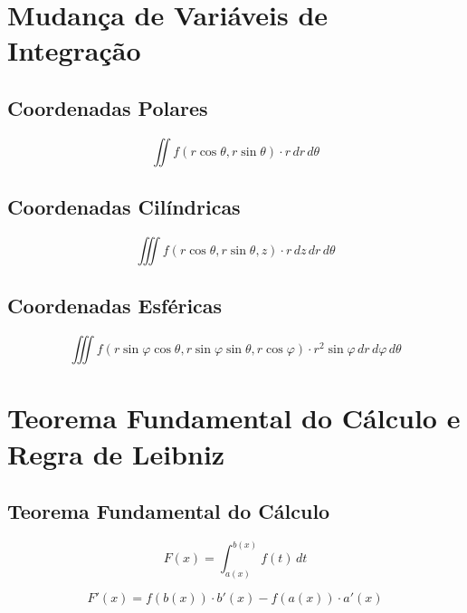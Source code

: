\documentclass[11pt, a4paper]{article}
\begin{document}
\section{Mudança de Variáveis de Integração}

\subsection{Coordenadas Polares}

\begin{equation*}
    \iint f\left(r\cos\theta, r\sin\theta\right) \cdot r\,dr\,d\theta
\end{equation*}

\subsection{Coordenadas Cilíndricas}

\begin{equation*}
    \iiint f\left(r\cos\theta, r\sin\theta, z\right) \cdot r\,dz\,dr\,d\theta
\end{equation*}

\subsection{Coordenadas Esféricas}

\begin{equation*}
    \iiint f\left(r\sin\varphi\cos\theta, r\sin\varphi\sin\theta, r\cos\varphi\right) \cdot r^2\sin\varphi\,dr\,d\varphi\,d\theta
\end{equation*}

\section{Teorema Fundamental do Cálculo e Regra de Leibniz}

\subsection{Teorema Fundamental do Cálculo}

\begin{equation*}
    F(x) = \int_{a(x)}^{b(x)} f(t) \, dt
\end{equation*}

\begin{equation*}
    F'(x) = f\left(b(x)\right) \cdot b'(x) - f\left(a(x)\right) \cdot a'(x)
\end{equation*}
\end{document}
